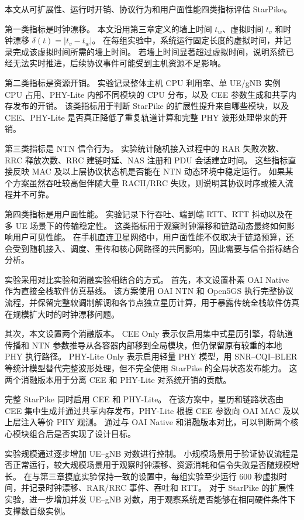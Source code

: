 本文从可扩展性、运行时开销、协议行为和用户面性能四类指标评估 StarPike。

第一类指标是时钟漂移。
本文沿用第三章定义的墙上时间 $t_w$、虚拟时间 $t_v$ 和时钟漂移 $\delta(t)=|t_v-t_w|$。
在每组实验中，系统运行固定长度的虚拟时间，并记录完成该虚拟时间所需的墙上时间。
若墙上时间显著超过虚拟时间，说明系统已经无法实时推进，后续协议事件可能受到主机资源不足影响。

第二类指标是资源开销。
实验记录整体主机 CPU 利用率、单 UE/gNB 实例 CPU 占用、PHY-Lite 内部不同模块的 CPU 分布，以及 CEE 参数生成和共享内存发布的开销。
该类指标用于判断 StarPike 的扩展性提升来自哪些模块，以及 CEE、PHY-Lite 是否真正降低了重复轨道计算和完整 PHY 波形处理带来的开销。

第三类指标是 NTN 信令行为。
实验统计随机接入过程中的 RAR 失败次数、RRC 释放次数、RRC 建链时延、NAS 注册和 PDU 会话建立时间。
这些指标直接反映 MAC 及以上层协议状态机是否能在 NTN 动态环境中稳定运行。
如果某个方案虽然吞吐较高但伴随大量 RACH/RRC 失败，则说明其协议时序或接入流程并不可靠。

第四类指标是用户面性能。
实验记录下行吞吐、端到端 RTT、RTT 抖动以及在多 UE 场景下的传输稳定性。
这类指标用于观察时钟漂移和链路动态最终如何影响用户可见性能。
在手机直连卫星网络中，用户面性能不仅取决于链路预算，还会受到随机接入、调度、重传和核心网路径的共同影响，因此需要与信令指标结合分析。


实验采用对比实验和消融实验相结合的方式。
首先，本文设置朴素 OAI Native 作为直接全栈软件仿真基线。
该方案使用 OAI NTN 和 Open5GS 执行完整协议流程，并保留完整软调制解调和各节点独立星历计算，用于暴露传统全栈软件仿真在规模扩大时的时钟漂移问题。

其次，本文设置两个消融版本。
CEE Only 表示仅启用集中式星历引擎，将轨道传播和 NTN 参数推导从各容器内部移到全局模块，但仍保留原有较重的本地 PHY 执行路径。
PHY-Lite Only 表示启用轻量 PHY 模型，用 SNR--CQI--BLER 等统计模型替代完整波形处理，但不完全使用 StarPike 的全局状态发布能力。
这两个消融版本用于分离 CEE 和 PHY-Lite 对系统开销的贡献。

完整 StarPike 同时启用 CEE 和 PHY-Lite。
在该方案中，星历和链路状态由 CEE 集中生成并通过共享内存发布，PHY-Lite 根据 CEE 参数向 OAI MAC 及以上层注入等价 PHY 观测。
通过与 OAI Native 和消融版本对比，可以判断两个核心模块组合后是否实现了设计目标。

实验规模通过逐步增加 UE--gNB 对数进行控制。
小规模场景用于验证协议流程是否正常运行，较大规模场景用于观察时钟漂移、资源消耗和信令失败是否随规模增长。
在与第三章摸底实验保持一致的设置中，每组实验至少运行 600 秒虚拟时间，并记录时钟漂移、RAR/RRC 事件、吞吐和 RTT。
对于 StarPike 的扩展性实验，进一步增加并发 UE--gNB 对数，用于观察系统是否能够在相同硬件条件下支撑数百级实例。

